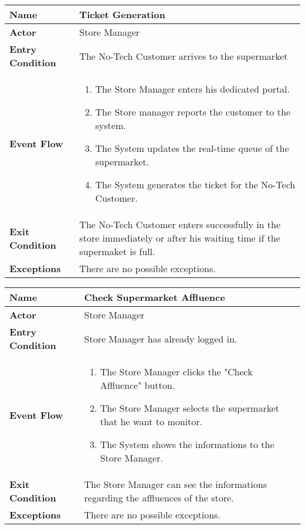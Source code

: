 \begin{center}
    \begin{tabular}{ | l | p{11cm} |}
    \hline
    \textbf{Name} & Ticket Generation\\ \hline
    \textbf{Actor} & Store Manager \\ \hline
    \textbf{Entry Condition} &  The No-Tech Customer arrives to the supermarket\\ \hline
    \textbf{Event Flow} & \begin{enumerate}
					\item The Store Manager enters his dedicated portal.
					\item The Store manager reports the customer to the system.
					\item The System updates the real-time queue of the supermarket.
					\item The System generates the ticket for the No-Tech Customer.
		            \end{enumerate}\\  \hline
    \textbf{Exit Condition} & The No-Tech Customer enters successfully in the store immediately or after his waiting time if the supermaket is full.\\ \hline
    \textbf{Exceptions} & There are no possible exceptions.\\  \hline
				
    \end{tabular}
\end{center}

\begin{center}
    \begin{tabular}{ | l | p{11cm} |}
    \hline
    \textbf{Name} & Check Supermarket Affluence\\ \hline
    \textbf{Actor} & Store Manager \\ \hline
    \textbf{Entry Condition} &  Store Manager has already logged in. \\ \hline
    \textbf{Event Flow} & \begin{enumerate}
					\item The Store Manager clicks the "Check Affluence" button.
					\item The Store Manager selects the supermarket that he want to monitor.
					\item The System shows the informations to the Store Manager.
		            \end{enumerate}\\  \hline
    \textbf{Exit Condition} & The Store Manager can see the informations regarding the affluences of the store. \\ \hline
    \textbf{Exceptions} & There are no possible exceptions.\\  \hline
				
    \end{tabular}
\end{center}


